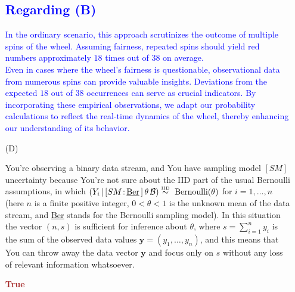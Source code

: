 \documentclass[12pt]{article}
\newcommand{\given}{\, | \,}
\renewcommand{\r}[1]{\text{#1}}
\renewcommand{\u}[1]{\underline{#1}}
\begin{document}
\begin{itemize}
\subsection*{\textcolor{blue}{\textbf{Regarding (B)}}}
\textcolor{blue}{
In the ordinary scenario, this approach scrutinizes the outcome of multiple spins of the wheel. Assuming fairness, repeated spins should yield red numbers approximately \textcolor{blue}{\(18\)} times out of \textcolor{blue}{\(38\)} on average.
\\
Even in cases where the wheel's fairness is questionable, observational data from numerous spins can provide valuable insights. Deviations from the expected \textcolor{blue}{\(18\)} out of \textcolor{blue}{\(38\)} occurrences can serve as crucial indicators. By incorporating these empirical observations, we adapt our probability calculations to reflect the real-time dynamics of the wheel, thereby enhancing our understanding of its behavior.
}
\item[(D)]

You're observing a binary data stream, and You have sampling model $[ SM ]$ uncertainty because You're not sure about the IID part of the usual Bernoulli assumptions, in which $( Y_i \given [ SM \colon \! \r{\u{Ber}} \, ] \, \theta \, \mathcal B ) \stackrel{ \textrm{\tiny IID} }{ \sim } \textrm{ Bernoulli} ( \theta )$ for $i = 1, \dots, n$ (here $n$ is a finite positive integer, $0 < \theta < 1$ is the unknown mean of the data stream, and \u{Ber} stands for the Bernoulli sampling model). In this situation the vector $( n, s )$ is sufficient for inference about $\theta$, where $s = \sum_{ i = 1 }^n y_i$ is the sum of the observed data values $\bm{ y } = ( y_1, \dots, y_n )$, and this means that You can throw away the data vector $\bm{ y }$ and focus only on $s$ without any loss of relevant information whatsoever.



\textcolor{brown}{\textbf{True}}


\end{itemize}
\end{document}
